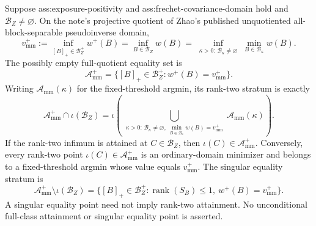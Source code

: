 Suppose ass:exposure-positivity and ass:frechet-covariance-domain hold and \(\mathcal B_Z\ne\varnothing\).  On the note's projective quotient of Zhao's published unquotiented all-block-separable pseudoinverse domain,
\[
v_{\mathrm{mm}}^+
:=\inf_{[B]_+\in\mathcal B_Z^+}w^+(B)
=\inf_{B\in\mathcal B_Z}w(B)
=\inf_{\substack{\kappa>0:\,\mathcal B_\kappa\ne\varnothing}}
\min_{B\in\mathcal B_\kappa}w(B).
\]
The possibly empty full-quotient equality set is
\[
\mathcal A_{\mathrm{mm}}^+
=\{[B]_+\in\mathcal B_Z^+:w^+(B)=v_{\mathrm{mm}}^+\}.
\]
Writing \(\mathcal A_{\mathrm{mm}}(\kappa)\) for the fixed-threshold argmin, its rank-two stratum is exactly
\[
\mathcal A_{\mathrm{mm}}^+\cap\iota(\mathcal B_Z)
=\iota\!\left(
\bigcup_{\substack{\kappa>0:\,
\mathcal B_\kappa\ne\varnothing,\ 
\min_{B\in\mathcal B_\kappa}w(B)=v_{\mathrm{mm}}^+}}
\mathcal A_{\mathrm{mm}}(\kappa)\right).
\]
If the rank-two infimum is attained at \(C\in\mathcal B_Z\), then \(\iota(C)\in\mathcal A_{\mathrm{mm}}^+\).  Conversely, every rank-two point \(\iota(C)\in\mathcal A_{\mathrm{mm}}^+\) is an ordinary-domain minimizer and belongs to a fixed-threshold argmin whose value equals \(v_{\mathrm{mm}}^+\).  The singular equality stratum is
\[
\mathcal A_{\mathrm{mm}}^+\setminus\iota(\mathcal B_Z)
=\{[B]_+\in\mathcal B_Z^+:\operatorname{rank}(S_B)\le1,\ w^+(B)=v_{\mathrm{mm}}^+\}.
\]
A singular equality point need not imply rank-two attainment.  No unconditional full-class attainment or singular equality point is asserted.